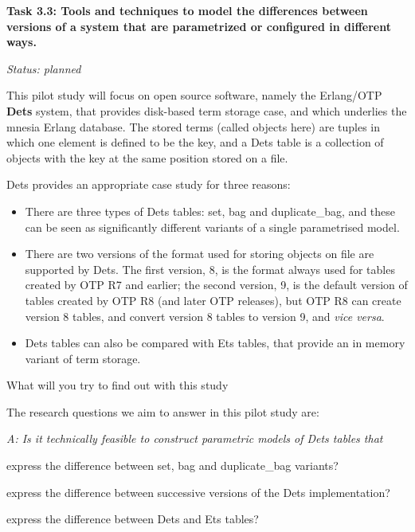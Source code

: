 \documentclass[a4paper,english]{article}
\title{}
\author{}
\date{2015-09-01}
\newcounter{questenum}
\newcounter{techenum}
\newcommand{\liststyleQuestion}{%
\renewcommand\theenumi{\roman{enumi}}
\renewcommand\theenumii{\alph{enumii}}
\renewcommand\theenumiii{\arabic{enumiii}}
\renewcommand\theenumiv{\arabic{enumiv}}
\renewcommand\labelenumi{\theenumi.}
\renewcommand\labelenumii{\theenumii.}
\renewcommand\labelenumiii{\theenumiii.}
\renewcommand\labelenumiv{\theenumiv.}
}
\newenvironment{questionenum}
{ \liststyleQuestion
  \enumerate
  \setcounter{enumi}{\value{questenum}}
  \bfseries
  \itshape }
{ \endenumerate
  \setcounter{questenum}{\value{enumi}} }
\newcommand{\liststyleTechnicalQuestion}{%
\renewcommand\theenumi{\arabic{enumi}}
\renewcommand\theenumii{\alph{enumii}}
\renewcommand\theenumiii{\roman{enumiii}}
\renewcommand\theenumiv{\arabic{enumiv}}
\renewcommand\labelenumi{\theenumi.}
\renewcommand\labelenumii{\theenumii.}
\renewcommand\labelenumiii{\theenumiii.}
\renewcommand\labelenumiv{\theenumiv.}
}
\newenvironment{techitemize}
{ \liststyleTechnicalQuestion 
  \itshape
  \enumerate
  \setcounter{enumi}{\value{techenum}} }
{ \endenumerate
  \setcounter{techenum}{\value{enumi}} }
\begin{document}
\setcounter{page}{1}\pagestyle{Standard} \textbf{Task 3.3: Tools and techniques to model the differences between 
versions of a system that are parametrized or configured in different ways.}

\textit{Status: planned}

This pilot study will focus on open source software, namely the Erlang/OTP \textbf{Dets} system, that provides 
disk-based term storage case, and which underlies the mnesia Erlang database. The stored terms (called
objects here) are tuples in which one element is defined to be the key, and a Dets table is a collection of objects 
with the key at the same position stored on a file.

Dets provides an appropriate case study for three reasons:

\begin{itemize}
\item There are three types of Dets tables: set, bag and duplicate\_bag, and these can be seen as significantly 
different variants of a single parametrised model.
\item There are two versions of the format used for storing objects on file are supported by Dets. The first version, 
8, is the format always used for tables created by OTP R7 and earlier; the second version, 9, is the default version of 
tables created by OTP R8 (and later OTP releases), but OTP R8 can create version 8 tables, and convert version
8 tables to version 9, and \textit{vice versa}.
\item Dets tables can also be compared with Ets tables, that provide an in memory variant of term storage. 
\end{itemize}

\begin{questionenum}
\item What will you try to find out with this study
\end{questionenum}


The research questions we aim to answer in this pilot study are:

\textit{A: Is it technically feasible to construct parametric models of Dets tables that}

\begin{techitemize}
\item express the difference between set, bag and duplicate\_bag variants?
\item express the difference between successive versions of the Dets implementation?
\item express the difference between Dets and Ets tables?
\end{techitemize}
\end{document}
